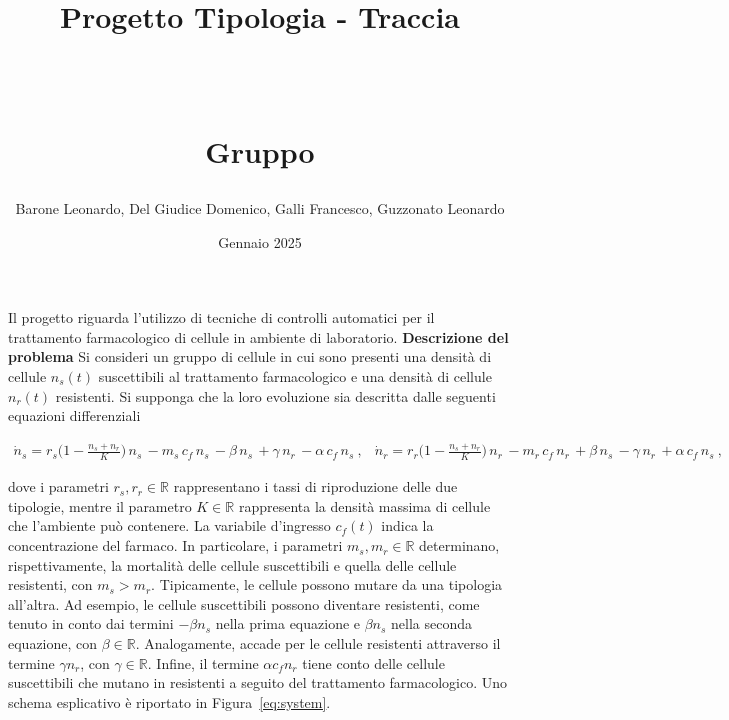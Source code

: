 \documentclass[a4paper, 11pt]{article}
\title{ \vspace{-1in}
		\huge \strut \coursename \strut 
		\\
		\Large  \strut Progetto Tipologia \tipology  - Traccia \trace 
		\\
		\Large  \strut \projectname\strut
		\\
		\Large  \strut Gruppo \group\strut
		\vspace{-0.4cm}
}
\author{Barone Leonardo, Del Giudice Domenico, Galli Francesco, Guzzonato Leonardo}
\date{Gennaio 2025}
\begin{document}
\maketitle
\vspace{-0.5cm}

Il progetto riguarda l’utilizzo di tecniche di controlli automatici per il trattamento farmacologico di cellule in ambiente di laboratorio.\newline \newline
\textbf{Descrizione del problema} \newline \newline
Si consideri un gruppo di cellule in cui sono presenti una densità di cellule $n_s(t)$ suscettibili al trattamento farmacologico e una densità di cellule $n_r(t)$ resistenti. Si supponga che la loro evoluzione sia descritta dalle
seguenti equazioni differenziali

%
\begin{subequations}\label{eq:system}
\begin{align}
	\dot{n}_s=r_s \bigl(1-\frac{n_s+n_r }{K}\bigr)\, n_s\, -m_s\, c_f\, n_s\, -\beta\, n_s\, +\gamma\, n_r\, -\alpha\, c_f\, n_s\ ,
\end{align}
\begin{align}
	\dot{n}_r=r_r \bigl(1-\frac{n_s+n_r }{K}\bigr)\, n_r\, -m_r\, c_f\, n_r\, +\beta\, n_s\, -\gamma\, n_r\, +\alpha\, c_f\, n_s\ ,
\end{align}
\end{subequations}
%


dove i parametri $r_s, r_r \in \mathbb{R}$ rappresentano i tassi di riproduzione delle due tipologie, mentre il parametro $K \in \mathbb{R}$ rappresenta la densità massima di cellule che l’ambiente può contenere. La variabile d’ingresso $c_f(t)$ indica la concentrazione del farmaco. In particolare, i parametri $m_s, m_r \in \mathbb{R}$ determinano, rispettivamente, la mortalità delle cellule suscettibili e quella delle cellule resistenti, con $m_s > m_r$. Tipicamente, le cellule possono mutare da una tipologia all’altra. Ad esempio, le cellule suscettibili possono diventare resistenti, come tenuto in conto dai termini $-\beta n_s$ nella prima equazione e $\beta n_s$ nella seconda equazione, con $\beta \in \mathbb{R}$. Analogamente, accade per le cellule resistenti attraverso il termine $\gamma n_r$, con $\gamma \in \mathbb{R}$. Infine, il termine $\alpha c_f n_r$ tiene conto delle cellule suscettibili che mutano in resistenti a seguito del trattamento farmacologico. Uno schema esplicativo è riportato in Figura~\eqref{eq:system}. 
\end{document}
